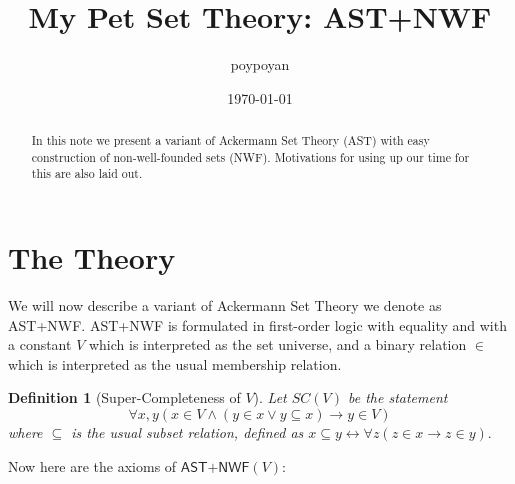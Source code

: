 \documentclass{article}
\title{My Pet Set Theory: \textsf{AST+NWF}}
\author{poypoyan}
\date{\petsa\today}
\newtheorem{definition}{Definition}[section]
\begin{document}
\maketitle

\begin{abstract}
In this note we present a variant of Ackermann Set Theory (AST) with easy construction of non-well-founded sets (NWF). Motivations for using up our time for this are also laid out.
\end{abstract}

\section{The Theory}
We will now describe a variant of Ackermann Set Theory \cite{ackermann} we denote as \textsf{AST+NWF}. \textsf{AST+NWF} is formulated in first-order logic with equality and with a constant $V$ which is interpreted as the set universe, and a binary relation $\in$ which is interpreted as the usual membership relation.

\begin{definition}[Super-Completeness of $V$]
Let $SC(V)$ be the statement $$\forall x, y (x \in V \wedge (y \in x \vee y \subseteq x) \rightarrow y \in V)$$ where $\subseteq$ is the usual subset relation, defined as $x \subseteq y \leftrightarrow \forall z(z \in x \rightarrow z \in y).$
\end{definition}

\noindent Now here are the axioms of $\textsf{AST+NWF}(V)$:
\end{document}
